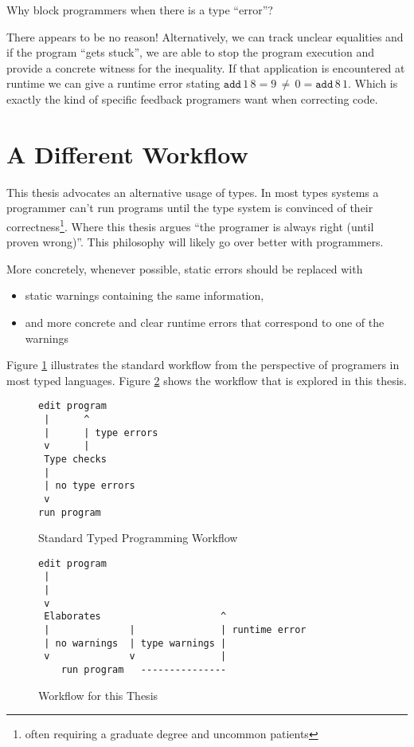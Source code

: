 Why block programmers when there is a type ``error''? 

There appears to be no reason! Alternatively, we can track unclear equalities and if the program ``gets stuck'', we are able to stop the program execution and provide a concrete witness for the inequality.
If that application is encountered at runtime we can give a runtime error stating $\mathtt{add}\,1\,8=9\,\neq\,0=\mathtt{add}\,8\,1$.
Which is exactly the kind of specific feedback programers want when correcting code.

\section{A Different Workflow}

This thesis advocates an alternative usage of types. In most types systems a programmer can't run programs until the type system is convinced of their correctness\footnote{often requiring a graduate degree and uncommon patients}.
Where this thesis argues ``the programer is always right (until proven wrong)''.
This philosophy will likely go over better with programmers.

More concretely, whenever possible, static errors should be replaced with 
\begin{itemize}
\item static warnings containing the same information, 
\item and more concrete and clear runtime errors that correspond to one of the warnings
\end{itemize}
Figure \ref{fig:intro-standard-workflow} illustrates the standard workflow from the perspective of programers in most typed languages.
Figure \ref{fig:intro-thesis-workflow} shows the workflow that is explored in this thesis. 

\begin{figure}
\begin{lstlisting}
edit program
 |      ^
 |      | type errors
 v      |
 Type checks
 |
 | no type errors
 v
run program
\end{lstlisting}


\caption{Standard Typed Programming Workflow}
\label{fig:intro-standard-workflow}
\end{figure}

\begin{figure}
\begin{lstlisting}
edit program
 |      
 |      
 v
 Elaborates                     ^
 |              |               | runtime error
 | no warnings  | type warnings |
 v              v               |
    run program   ---------------
\end{lstlisting}


\caption{Workflow for this Thesis}
\label{fig:intro-thesis-workflow}
\end{figure}

